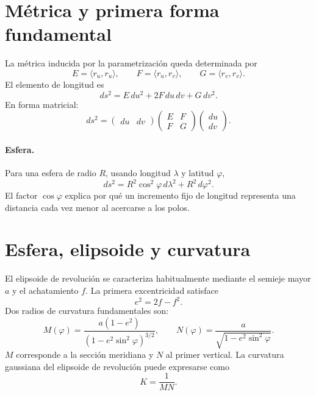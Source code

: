 \section{Métrica y primera forma fundamental}\label{sec:metrica}

{\small\vspace{1mm}\par}


La métrica inducida por la parametrización queda determinada por
\[
  E=\langle r_u,r_u\rangle,\qquad
  F=\langle r_u,r_v\rangle,\qquad
  G=\langle r_v,r_v\rangle.
\]
El elemento de longitud es
\[
  \boxed{ds^2=E\,du^2+2F\,du\,dv+G\,dv^2}.
\]
En forma matricial:
\[
  ds^2=
  \begin{pmatrix}du&dv\end{pmatrix}
  \begin{pmatrix}E&F\\F&G\end{pmatrix}
  \begin{pmatrix}du\\dv\end{pmatrix}.
\]

\paragraph{Esfera.}
Para una esfera de radio \(R\), usando longitud \(\lambda\) y latitud \(\varphi\),
\[
  ds^2=R^2\cos^2\varphi\,d\lambda^2+R^2\,d\varphi^2.
\]
El factor \(\cos\varphi\) explica por qué un incremento fijo de longitud representa una
distancia cada vez menor al acercarse a los polos.

\section{Esfera, elipsoide y curvatura}

El elipsoide de revolución se caracteriza habitualmente mediante el semieje mayor \(a\) y
el achatamiento \(f\). La primera excentricidad satisface
\[
  e^2=2f-f^2.
\]
Dos radios de curvatura fundamentales son:
\[
  \boxed{
  M(\varphi)=
  \frac{a(1-e^2)}{(1-e^2\sin^2\varphi)^{3/2}}
  },
  \qquad
  \boxed{
  N(\varphi)=
  \frac{a}{\sqrt{1-e^2\sin^2\varphi}}
  }.
\]
\(M\) corresponde a la sección meridiana y \(N\) al primer vertical. La curvatura gaussiana
del elipsoide de revolución puede expresarse como
\[
  K=\frac{1}{MN}.
\]

\begin{center}
\end{center}

